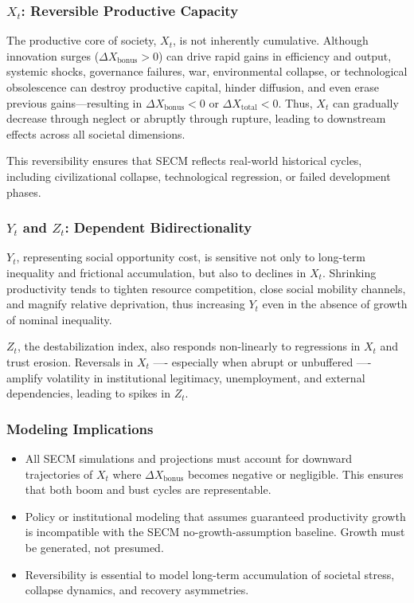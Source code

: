 \documentclass[12pt]{report}
\begin{document}
\subsubsection{$X_t$: Reversible Productive Capacity}
The productive core of society, $X_t$, is not inherently cumulative. Although innovation surges ($\Delta X_{\text{bonus}} > 0$) can drive rapid gains in efficiency and output, systemic shocks, governance failures, war, environmental collapse, or technological obsolescence can destroy productive capital, hinder diffusion, and even erase previous gains---resulting in $\Delta X_{\text{bonus}} < 0$ or $\Delta X_{\text{total}} < 0$. Thus, $X_t$ can gradually decrease through neglect or abruptly through rupture, leading to downstream effects across all societal dimensions.

This reversibility ensures that SECM reflects real-world historical cycles, including civilizational collapse, technological regression, or failed development phases.

\subsubsection{$Y_t$ and $Z_t$: Dependent Bidirectionality}
$Y_t$, representing social opportunity cost, is sensitive not only to long-term inequality and frictional accumulation, but also to declines in $X_t$. Shrinking productivity tends to tighten resource competition, close social mobility channels, and magnify relative deprivation, thus increasing $Y_t$ even in the absence of growth of nominal inequality.

$Z_t$, the destabilization index, also responds non-linearly to regressions in $X_t$ and trust erosion. Reversals in $X_t$ ---- especially when abrupt or unbuffered ----amplify volatility in institutional legitimacy, unemployment, and external dependencies, leading to spikes in $Z_t$.

\subsubsection{Modeling Implications}
\begin{itemize}
  \item All SECM simulations and projections must account for downward trajectories of $X_t$ where $\Delta X_{\text{bonus}}$ becomes negative or negligible. This ensures that both boom and bust cycles are representable.
  \item Policy or institutional modeling that assumes guaranteed productivity growth is incompatible with the SECM no-growth-assumption baseline. Growth must be generated, not presumed.
  \item Reversibility is essential to model long-term accumulation of societal stress, collapse dynamics, and recovery asymmetries.
\end{itemize}
\end{document}
